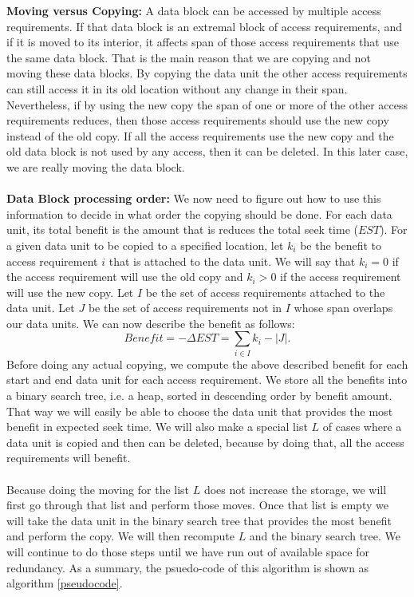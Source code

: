 {\bf Moving versus Copying:} A data block can be accessed by multiple access
requirements. If that data block is an extremal block of access
requirements, and if it is moved to its interior, it affects span of those access
requirements that use the
same data block. That is the main reason that we are copying and not moving
these data blocks. By copying the data unit the other access requirements can
still access it in its old location without any change in their span.
Nevertheless, if by using the new copy the span of one or more of the other
access requirements reduces, then those access requirements should use the new
copy instead of the old copy. If all the access requirements use the new copy
and the old data block is not used by any access, then it can be deleted. In
this later case, we are really moving the data block. \\
\\
{\bf Data Block processing order:} 
We now need to figure out how to use this
information to decide in what order the copying should be done. For each data
unit, its total benefit is the amount that is reduces the total seek time
($EST$). For a given data unit to be copied to a specified location, let $k_i$
be the benefit to access requirement $i$ that is attached to the data unit. We
will say that $k_i=0$ if the access requirement will use the old copy and
$k_i>0$  if the access requirement will use the new copy. Let $I$ be the set of
access requirements attached to the data unit. Let $J$ be the set of access
requirements not in $I$ whose span overlaps our data units. We can now describe
the benefit as follows: 
\[
Benefit = -\Delta EST = \sum_{i \in I} k_i - |J|.
\]
Before doing any actual copying, we compute the above described benefit for
each start and end data unit for each access requirement. We store all the
benefits into a binary search tree, i.e. a heap, sorted in descending order by benefit
amount. That way we will easily be able to choose the data unit that provides
the most benefit in expected seek time. We will also make a special list $L$ of
cases where a data unit is copied and then can be deleted, because by doing
that, all the access
requirements will benefit. \\
\\
Because doing the moving for the list $L$ does not increase the storage, we will first go through that list and perform those moves. Once that list is empty we will take the data unit in the binary search tree that provides the most benefit and perform the copy. We will then recompute $L$ and the binary search tree. We will continue to do those steps until we have run out of available space for redundancy. As a summary, the psuedo-code of this algorithm is shown as algorithm \ref{pseudocode}.

